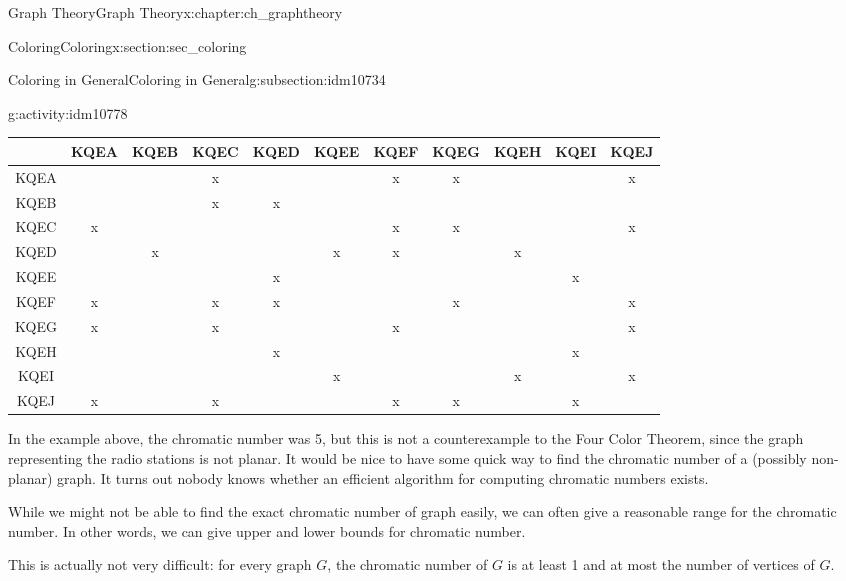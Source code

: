 \documentclass[oneside,10pt,]{book}
\numberwithin{equation}{chapter}
\begin{document}
\begin{chapterptx}{Graph Theory}{}{Graph Theory}{}{}{x:chapter:ch_graphtheory}
\begin{sectionptx}{Coloring}{}{Coloring}{}{}{x:section:sec_coloring}
\begin{subsectionptx}{Coloring in General}{}{Coloring in General}{}{}{g:subsection:idm10734}
\begin{activity}{}{g:activity:idm10778}
\begin{sidebyside}{1}{0}{0}{0}
\begin{sbspanel}{1}
{\begin{tabular}{c|c|c|c|c|c|c|c|c|c|c|}
 & {\tiny KQEA}&{\tiny KQEB}&{\tiny KQEC}&{\tiny KQED}&{\tiny KQEE}&{\tiny KQEF}&{\tiny KQEG}&{\tiny  KQEH}&{\tiny  KQEI}&{\tiny KQEJ } \\ \hline
{\tiny KQEA }&      &      &   x  &      &      &   x  &   x  &      &      &  x   \\ \hline
{\tiny KQEB }&      &      &   x  &   x  &      &      &      &      &      &      \\ \hline
{\tiny KQEC }&   x  &      &      &      &      &   x  &   x  &      &      &  x   \\ \hline
{\tiny KQED }&      &  x   &      &      &  x   &  x   &      &  x   &      &      \\ \hline
{\tiny KQEE }&      &      &      &  x   &      &      &      &      &  x   &      \\ \hline
{\tiny KQEF }&  x   &      &  x   &  x   &      &      &   x  &      &      &  x   \\ \hline
{\tiny KQEG }&  x   &      &  x   &      &      &  x   &      &      &      &  x   \\ \hline
{\tiny KQEH }&      &      &      &  x   &      &      &      &      &  x   &      \\ \hline
{\tiny KQEI }&      &      &      &      &  x   &      &      &  x   &      &  x   \\ \hline
{\tiny KQEJ }&  x   &      &  x   &      &      &  x   &   x  &      &  x   &      \\ \hline
\end{tabular}
}%
\end{sbspanel}%
\end{sidebyside}%
\end{activity}
In the example above, the chromatic number was 5, but this is not a counterexample to the Four Color Theorem, since the graph representing the radio stations is not planar. It would be nice to have some quick way to find the chromatic number of a (possibly non-planar) graph. It turns out nobody knows whether an efficient algorithm for computing chromatic numbers exists.%
\par
While we might not be able to find the exact chromatic number of graph easily, we can often give a reasonable range for the chromatic number. In other words, we can give upper and lower bounds for chromatic number.%
\par
This is actually not very difficult: for every graph \(G\), the chromatic number of \(G\) is at least 1 and at most the number of vertices of \(G\).%
\par

\end{subsectionptx}
\end{sectionptx}
\end{chapterptx}
\end{document}
